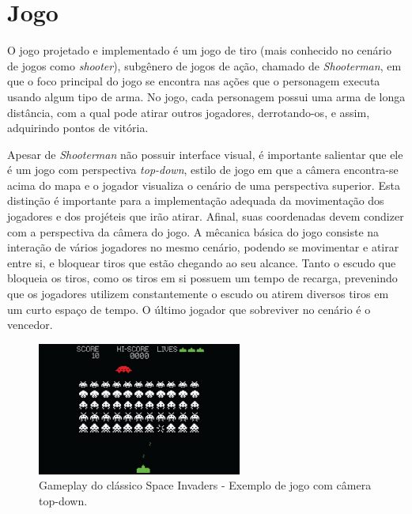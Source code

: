 \section{Jogo}
\label{shoterman}

O jogo projetado e implementado é um jogo de tiro (mais conhecido no cenário de jogos como \textit{shooter}), subgênero de jogos de ação, chamado de \textit{Shooterman}, em que o foco principal do jogo se encontra nas ações que o personagem executa usando algum tipo de arma. No jogo, cada personagem possui uma arma de longa distância, com a qual pode atirar outros jogadores, derrotando-os, e assim, adquirindo pontos de vitória.

Apesar de \textit{Shooterman} não possuir interface visual, é importante salientar que ele é um jogo com perspectiva \textit{top-down}, estilo de jogo em que a câmera encontra-se acima do mapa e o jogador visualiza o cenário de uma perspectiva superior. Esta distinção é importante para a implementação adequada da movimentação dos jogadores e dos projéteis que irão atirar. Afinal, suas coordenadas devem condizer com a perspectiva da câmera do jogo. A mêcanica básica do jogo consiste na interação de vários jogadores no mesmo cenário, podendo se movimentar e atirar entre si, e bloquear tiros que estão chegando ao seu alcance. Tanto o escudo que bloqueia os tiros, como os tiros em si possuem um tempo de recarga, prevenindo que os jogadores utilizem constantemente o escudo ou atirem diversos tiros em um curto espaço de tempo. O último jogador que sobreviver no cenário é o vencedor.


\begin{figure}[h!]
  \begin{center}
    \includegraphics[width=0.6\textwidth]{imagens/space_invaders.jpg}
    \caption{Gameplay do clássico Space Invaders - Exemplo de jogo com câmera top-down.}
    \label{fig:space} 
  \end{center}
\end{figure}


